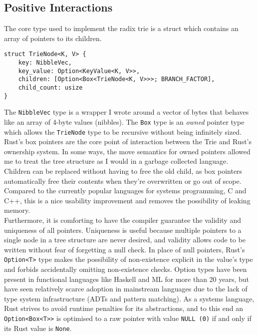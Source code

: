 \documentclass[a4paper,12pt]{article}
\newcommand{\code}{\texttt}
\begin{document}
\subsection{Positive Interactions}

The core type used to implement the radix trie is a struct which contains an array of pointers to its children.

\begin{verbatim}
struct TrieNode<K, V> {
    key: NibbleVec,
    key_value: Option<KeyValue<K, V>>,
    children: [Option<Box<TrieNode<K, V>>>; BRANCH_FACTOR],
    child_count: usize
}
\end{verbatim}

The \code{NibbleVec} type is a wrapper I wrote around a vector of bytes that behaves like an array of 4-byte values (nibbles). The \code{Box} type is an \textit{owned} pointer type which allows the \code{TrieNode} type to be recursive without being infinitely sized. Rust's box pointers are the core point of interaction between the Trie and Rust's ownership system. In some ways, the move semantics for owned pointers allowed me to treat the tree structure as I would in a garbage collected language. Children can be replaced without having to free the old child, as box pointers automatically free their contents when they're overwritten or go out of scope. Compared to the currently popular languages for systems programming, C and C++, this is a nice usability improvement and removes the possibility of leaking memory.\\

Furthermore, it is comforting to have the compiler guarantee the validity and uniqueness of all pointers. Uniqueness is useful because multiple pointers to a single node in a tree structure are never desired, and validity allows code to be written without fear of forgetting a null check. In place of null pointers, Rust's \code{Option<T>} type makes the possibility of non-existence explicit in the value's type and forbids accidentally omitting non-existence checks. Option types have been present in functional languages like Haskell and ML for more than 20 years, but have seen relatively scarce adoption in mainstream languages due to the lack of type system infrastructure (ADTs and pattern matching). As a systems language, Rust strives to avoid runtime penalties for its abstractions, and to this end an \code{Option<Box<T>>} is optimised to a raw pointer with value \code{NULL (0)} if and only if its Rust value is \code{None}.\\
\end{document}
